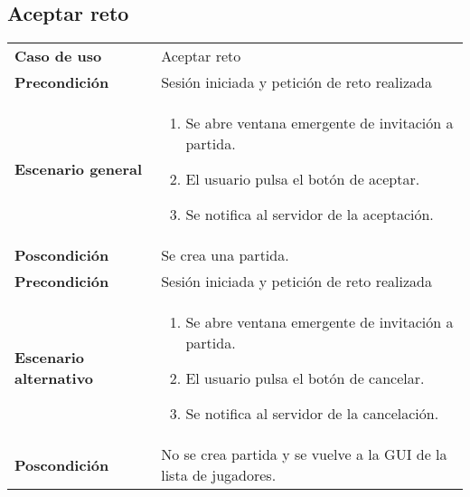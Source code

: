 \subsection{Aceptar reto}
{\footnotesize
\begin{tabularx}{0.95\textwidth}{p{}|X}

\textbf{Caso de uso} & Aceptar reto \\

\textbf{Precondición} & Sesión iniciada y petición de reto realizada\\

\textbf{Escenario general} & \begin{enumerate}
\item Se abre ventana emergente de invitación a partida.
\item El usuario pulsa el botón de aceptar.
\item Se notifica al servidor de la aceptación.
\end{enumerate} \\

\textbf{Poscondición} & Se crea una partida.\\

\textbf{Precondición} & Sesión iniciada y petición de reto realizada\\
\textbf{Escenario alternativo} & \begin{enumerate}
\item Se abre ventana emergente de invitación a partida.
\item El usuario pulsa el botón de cancelar.
\item Se notifica al servidor de la cancelación.
\end{enumerate}\\

\textbf{Poscondición}& No se crea partida y se vuelve a la GUI de la lista de jugadores.

\end{tabularx}
}

